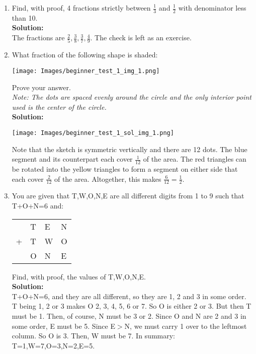 \documentclass{article}
\begin{document}
\begin{enumerate}[1.]
\item Find, with proof, 4 fractions strictly between $\frac{1}{3}$ and $\frac{1}{2}$ with denominator less than 10.\\ %

\textbf{Solution:}\\
The fractions are $\frac{2}{5},\frac{3}{8},\frac{3}{7},\frac{4}{9}$. The check is left as an exercise.\\

\newpage

\item What fraction of the following shape is shaded:
\begin{center}
	\texttt{[image: Images/beginner\_test\_1\_img\_1.png]}	
\end{center}
Prove your answer.\\
\textit{Note: The dots are spaced evenly around the circle and the only interior point used is the center of the circle.}\\

\textbf{Solution:}\\
\begin{center}
	\texttt{[image: Images/beginner\_test\_1\_sol\_img\_1.png]}	
\end{center}
Note that the sketch is symmetric vertically and there are 12 dots. The blue segment and its counterpart each cover $\frac{1}{12}$ of the area. The red triangles can be rotated into the yellow triangles to form a segment on either side that each cover $\frac{2}{12}$ of the area. Altogether, this makes $\frac{6}{12}=\frac{1}{2}$.\\



\item You are given that T,W,O,N,E are all different digits from 1 to 9 such that T+O+N=6 and:
\begin{center}
	\begin{tabular}{m{1cm} m{0.5cm} m{0.5cm} m{0.5cm}}
		&T&E&N\\
		+&T&W&O\\
		\hline
		&O&N&E\\
		\hline
	\end{tabular}
\end{center}
Find, with proof, the values of T,W,O,N,E.\\

\textbf{Solution:}\\
T+O+N=6, and they are all different, so they are 1, 2 and 3 in some order. T being 1, 2 or 3 makes O 2, 3, 4, 5, 6 or 7. So O is either 2 or 3. But then T must be 1. Then, of course, N must be 3 or 2. Since O and N are 2 and 3 in some order, E must be 5. Since E$>$N, we must carry 1 over to the leftmost column. So O is 3. Then, W must be 7. In summary: T=1,W=7,O=3,N=2,E=5.\\




\end{enumerate}
\end{document}

